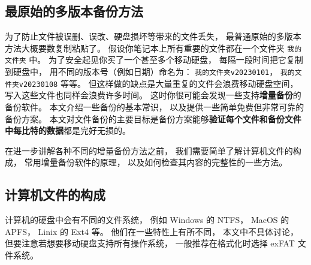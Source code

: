 
\subsection{最原始的多版本备份方法}
为了防止文件被误删、误改、硬盘损坏等带来的文件丢失， 最普通原始的多版本方法大概要数复制粘贴了。 假设你笔记本上所有重要的文件都在一个文件夹 \verb|我的文件夹| 中。 为了安全起见你买了一个甚至多个移动硬盘， 每隔一段时间把它复制到硬盘中， 用不同的版本号（例如日期）命名为： \verb|我的文件夹v20230101|， \verb|我的文件夹v20230108| 等等。 但这样做的缺点是大量重复的文件会浪费移动硬盘空间， 写入这些文件也同样会浪费许多时间。 这时你很可能会发现一些支持\textbf{增量备份}的备份软件。 本文介绍一些备份的基本常识， 以及提供一些简单免费但非常可靠的备份方案。 本文对文件备份的主要目标是备份方案能够\textbf{验证每个文件和备份文件中每比特的数据}都是完好无损的。

在进一步讲解各种不同的增量备份方法之前， 我们需要简单了解计算机文件的构成， 常用增量备份软件的原理， 以及如何检查其内容的完整性的一些方法。

\subsection{计算机文件的构成}
计算机的硬盘中会有不同的文件系统， 例如 Windows 的 NTFS， MacOS 的 APFS， Linix 的 Ext4 等。 他们在一些特性上有所不同， 本文中不具体讨论， 但要注意若想要移动硬盘支持所有操作系统， 一般推荐在格式化时选择 exFAT 文件系统。

